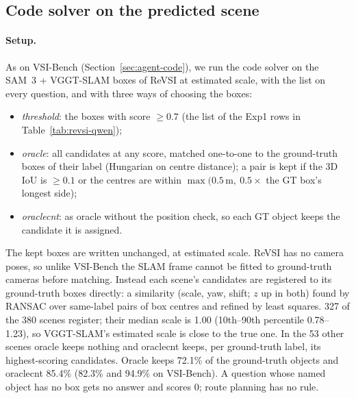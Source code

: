 \subsection{Code solver on the predicted scene}
\label{sec:revsi-code}

\paragraph{Setup.}
As on VSI-Bench (Section~\ref{sec:agent-code}), we run the code solver on the SAM~3 + VGGT-SLAM boxes of ReVSI at
estimated scale, with the list on every question, and with three ways of choosing the boxes:
\begin{itemize}
\item \emph{threshold}: the boxes with score $\geq 0.7$ (the list of the Exp1 rows in Table~\ref{tab:revsi-qwen});
\item \emph{oracle}: all candidates at any score, matched one-to-one to the ground-truth boxes of their label (Hungarian on
  centre distance); a pair is kept if the 3D IoU is $\geq 0.1$ or the centres are within $\max(0.5\,\mathrm{m},\ 0.5\times$
  the GT box's longest side);
\item \emph{oraclecnt}: as oracle without the position check, so each GT object keeps the candidate it is assigned.
\end{itemize}
The kept boxes are written unchanged, at estimated scale. ReVSI has no camera poses, so unlike VSI-Bench the SLAM frame cannot
be fitted to ground-truth cameras before matching. Instead each scene's candidates are registered to its ground-truth boxes
directly: a similarity (scale, yaw, shift; $z$ up in both) found by RANSAC over same-label pairs of box centres and refined by
least squares. 327 of the 380 scenes register; their median scale is 1.00 (10th--90th percentile 0.78--1.23), so VGGT-SLAM's
estimated scale is close to the true one. In the 53 other scenes oracle keeps nothing and oraclecnt keeps, per ground-truth
label, its highest-scoring candidates. Oracle keeps 72.1\% of the ground-truth objects and oraclecnt 85.4\% (82.3\% and
94.9\% on VSI-Bench). A question whose named object has no box gets no answer and scores 0; route planning has no rule.

